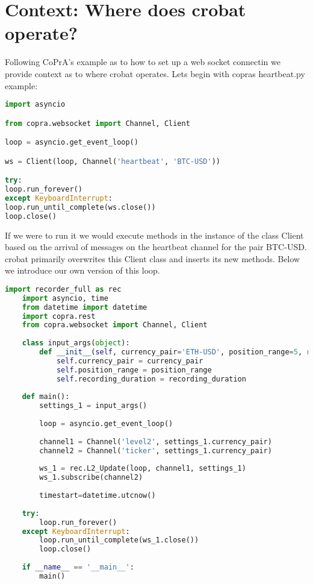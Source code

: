 \section{Context: Where does crobat operate?}

Following CoPrA's example as to how to set up a web socket connectin we provide context as to where crobat operates. Lets begin with copras heartbeat.py example:

\begin{lstlisting}[language=Python]
import asyncio

from copra.websocket import Channel, Client

loop = asyncio.get_event_loop()

ws = Client(loop, Channel('heartbeat', 'BTC-USD'))

try:
loop.run_forever()
except KeyboardInterrupt:
loop.run_until_complete(ws.close())
loop.close()
\end{lstlisting}

If we were to run it we would execute methods in the instance of the class Client based on the arrival of messages on the heartbeat channel for the pair BTC-USD. crobat primarily overwrites this Client class and inserts its new methods. Below we introduce our own version of this loop.

\begin{lstlisting}[language=Python]
	import recorder_full as rec
	import asyncio, time
	from datetime import datetime
	import copra.rest
	from copra.websocket import Channel, Client
	
	class input_args(object):
		def __init__(self, currency_pair='ETH-USD', position_range=5, recording_duration=5):
			self.currency_pair = currency_pair
			self.position_range = position_range
			self.recording_duration = recording_duration
	
	def main():
		settings_1 = input_args()
	
		loop = asyncio.get_event_loop()
	
		channel1 = Channel('level2', settings_1.currency_pair) 
		channel2 = Channel('ticker', settings_1.currency_pair)
	
		ws_1 = rec.L2_Update(loop, channel1, settings_1)
		ws_1.subscribe(channel2)
	
		timestart=datetime.utcnow()
	
	try:     
		loop.run_forever()
	except KeyboardInterrupt:
		loop.run_until_complete(ws_1.close())
		loop.close()
	
	if __name__ == '__main__':
		main()
\end{lstlisting}

